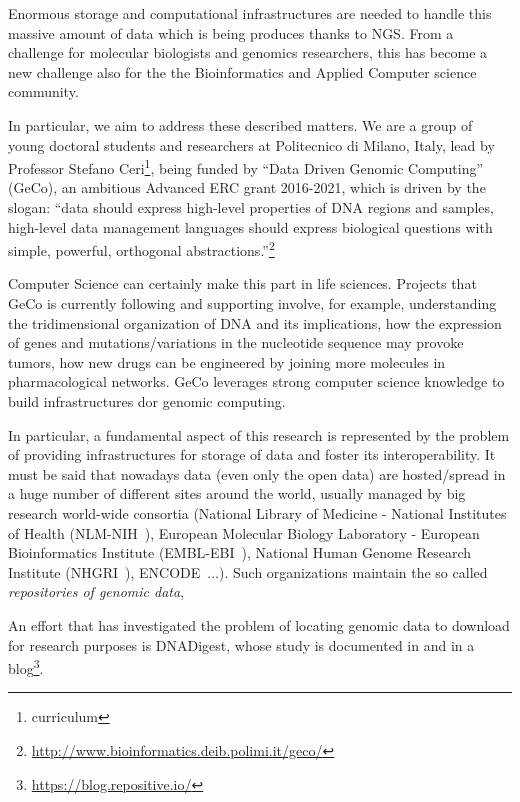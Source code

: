\documentclass[journal]{IEEEtran}
\begin{document}
Enormous storage and computational infrastructures are needed to handle this massive amount of data which is being produces thanks to NGS. From a challenge for molecular biologists and genomics researchers, this has become a new challenge also for the the Bioinformatics and Applied Computer science community.

In particular, we aim to address these described  matters. We are a group of young doctoral students and researchers at Politecnico di Milano, Italy, lead by Professor Stefano Ceri\footnote{curriculum}, being funded by ``Data Driven Genomic Computing'' (GeCo), an ambitious Advanced ERC grant 2016-2021, which is driven by the slogan: ``data should express high-level properties of DNA regions and samples, high-level data management languages should express biological questions with simple, powerful, orthogonal abstractions.''\footnote{\url{http://www.bioinformatics.deib.polimi.it/geco/}}

Computer Science can certainly make this part in life sciences. Projects that GeCo is  currently following and supporting involve, for example, understanding the tridimensional organization of DNA and its implications, how the expression of genes and mutations/variations in the nucleotide sequence may provoke tumors, how new drugs can be engineered by joining more molecules in pharmacological networks. 
GeCo leverages strong computer science knowledge to build infrastructures dor genomic computing.


In particular, a fundamental aspect of this research is represented by the problem of providing infrastructures for storage of data and foster its interoperability.
It must be said that nowadays data (even only the open data) are hosted/spread in a huge number of different sites around the world, usually managed by big research world-wide consortia (National Library of Medicine - National Institutes of Health (NLM-NIH~\cite{}), European Molecular Biology Laboratory  - European Bioinformatics Institute (EMBL-EBI~\cite{}), National Human Genome Research Institute (NHGRI~\cite{}), ENCODE~\cite{}...). Such organizations maintain the so called \textit{repositories of genomic data}, 



An effort that has investigated the problem of locating genomic data to download for research purposes is DNADigest, whose study is documented in \cite{kovalevskaya2016dnadigest} and in a blog\footnote{\url{https://blog.repositive.io/}}.
\end{document}

